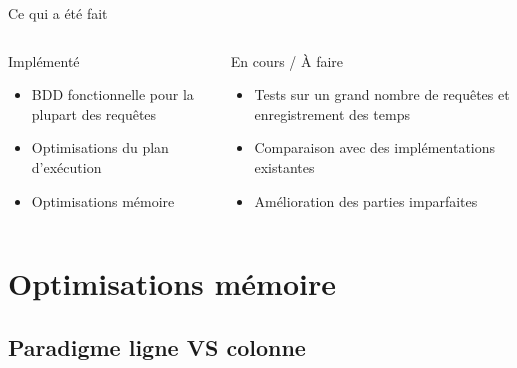 \documentclass[a4paper,12pt]{beamer}
\begin{document}
\begin{frame}{Ce qui a été fait}
    \begin{columns}[T]
        \begin{block}{Implémenté}
            \begin{itemize}
                \item BDD fonctionnelle pour la plupart des requêtes
                \item Optimisations du plan d'exécution
                \item Optimisations mémoire
            \end{itemize}
        \end{block}

        \begin{block}{En cours / À faire}
            \begin{itemize}
                \item Tests sur un grand nombre de requêtes et enregistrement des temps
                \item Comparaison avec des implémentations existantes
                \item Amélioration des parties imparfaites
            \end{itemize}
        \end{block}
    \end{columns}
\end{frame}

\section{Optimisations mémoire}

\subsection{Paradigme ligne VS colonne}
\end{document}
